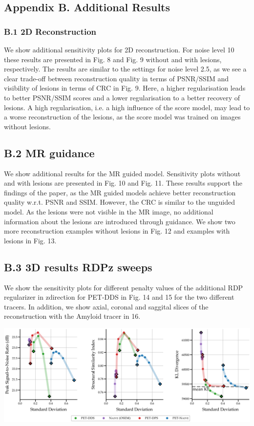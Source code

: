 \documentclass{article}
\begin{document}
\subsection{Appendix B. Additional Results}

\subsubsection{B.1 2D Reconstruction}

We show additional sensitivity plots for 2D reconstruction. For noise level 10 these results are presented in Fig. 8 and Fig. 9 without and with lesions, respectively. The results are similar to the settings for noise level 2.5, as we see a clear trade-off between reconstruction quality in terms of PSNR/SSIM and visibility of lesions in terms of CRC in Fig. 9. Here, a higher regularisation leads to better PSNR/SSIM scores and a lower regularisation to a better recovery of lesions. A high regularisation, i.e. a high influence of the score model, may lead to a worse reconstruction of the lesions, as the score model was trained on images without lesions.

\subsection{B.2 MR guidance}

We show additional results for the MR guided model. Sensitivity plots without and with lesions are presented in Fig. 10 and Fig. 11. These results support the findings of the paper, as the MR guided models achieve better reconstruction quality w.r.t. PSNR and SSIM. However, the CRC is similar to the unguided model. As the lesions were not visible in the MR image, no additional information about the lesions are introduced through guidance. We show two more reconstruction examples without lesions in Fig. 12 and examples with lesions in Fig. 13.

\subsection{B.3 3D results RDPz sweeps}

We show the sensitivity plots for different penalty values of the additional RDP regularizer in zdirection for PET-DDS in Fig. 14 and 15 for the two different tracers. In addition, we show axial, coronal and saggital slices of the reconstruction with the Amyloid tracer in 16.


\includegraphics{_page_32_Figure_1.png}
\end{document}
